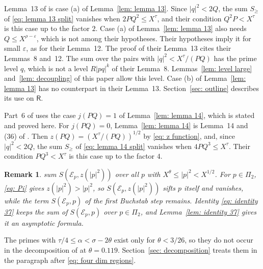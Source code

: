 \documentclass{article}
\numberwithin{equation}{section}
\newtheorem{remark}[lemma]{Remark}
\newcommand{\Le}{\leqslant}
\newcommand{\Ge}{\geqslant}
\begin{document}
Lemma~13 of \citet{harman2001gaussian} is case (a) of Lemma~\ref{lem: lemma 13}. Since $|q|^2 < 2Q$, the sum $S_\Ge$ of \eqref{eq: lemma 13 split} vanishes when $2PQ^2 \Le X^{\tau}$, and their condition $Q^2P < X^{\tau}$ is this case up to the factor $2$. Case (a) of Lemma~\ref{lem: lemma 13} also needs $Q \Le X^{\rho - \varepsilon}$, which is not among their hypotheses. Their hypotheses imply it for small $\varepsilon$, as for their Lemma~12. The proof of their Lemma~13 cites their Lemmas~8 and~12. The sum over the pairs with $|q|^2 < X^{\tau}/(PQ)$ has the prime level $q$, which is not a level $R|pq|^k$ of their Lemma~8. Lemmas~\ref{lem: level large} and~\ref{lem: decoupling} of this paper allow this level. Case (b) of Lemma~\ref{lem: lemma 13} has no counterpart in their Lemma~13. Section~\ref{sec: outline} describes its use on $\mathsf{R}$.

Part~6 of \citet[\S5]{harman2001gaussian} uses the case $j(PQ) = 1$ of Lemma~\ref{lem: lemma 14}, which is stated and proved here. For $j(PQ) = 0$, Lemma~\ref{lem: lemma 14} is Lemma~14 and (36) of \citet{harman2001gaussian}. Then $z(PQ) = (X^{\tau}/(PQ))^{1/2}$ by \eqref{eq: z function}, and, since $|q|^2 < 2Q$, the sum $S_\Ge$ of \eqref{eq: lemma 14 split} vanishes when $4PQ^3 \Le X^{\tau}$. Their condition $PQ^3 < X^{\tau}$ is this case up to the factor $4$.

\begin{remark}
\label{rem: second term 37}
\citet[(37)]{harman2001gaussian} sum $S(\mathcal{E}_p, z(|p|^2))$ over all $p$ with $X^{\theta} \Le |p|^2 < X^{1/2}$. For $p \in \Pi_2$, \eqref{eq: Pi} gives $z(|p|^2) > |p|^2$, so $S(\mathcal{E}_p, z(|p|^2))$ sifts $p$ itself and vanishes, while the term $S(\mathcal{E}_p, p)$ of the first Buchstab step remains. Identity \eqref{eq: identity 37} keeps the sum of $S(\mathcal{E}_p, p)$ over $p \in \Pi_2$, and Lemma~\ref{lem: identity 37} gives it an asymptotic formula.
\end{remark}

The primes with $\tau/4 \Le \alpha < \sigma - 2\theta$ exist only for $\theta < 3/26$, so they do not occur in the decomposition of \citet[\S5]{harman2001gaussian} at $\theta = 0.119$. Section~\ref{sec: decomposition} treats them in the paragraph after \eqref{eq: four dim regions}.
\end{document}
